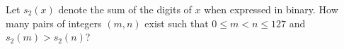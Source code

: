 Let $s_2(x)$ denote the sum of the digits of $x$ when expressed in binary. How many pairs of integers $(m,n)$ exist such that $0\leq m<n\leq 127$ and $s_2(m)>s_2(n)$?
